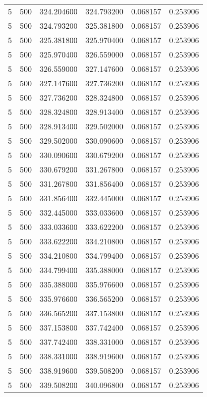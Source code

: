\begin{longtable}{rrrrrr}
5 & 500 & 324.204600 & 324.793200 & 0.068157 & 0.253906 \\
5 & 500 & 324.793200 & 325.381800 & 0.068157 & 0.253906 \\
5 & 500 & 325.381800 & 325.970400 & 0.068157 & 0.253906 \\
5 & 500 & 325.970400 & 326.559000 & 0.068157 & 0.253906 \\
5 & 500 & 326.559000 & 327.147600 & 0.068157 & 0.253906 \\
5 & 500 & 327.147600 & 327.736200 & 0.068157 & 0.253906 \\
5 & 500 & 327.736200 & 328.324800 & 0.068157 & 0.253906 \\
5 & 500 & 328.324800 & 328.913400 & 0.068157 & 0.253906 \\
5 & 500 & 328.913400 & 329.502000 & 0.068157 & 0.253906 \\
5 & 500 & 329.502000 & 330.090600 & 0.068157 & 0.253906 \\
5 & 500 & 330.090600 & 330.679200 & 0.068157 & 0.253906 \\
5 & 500 & 330.679200 & 331.267800 & 0.068157 & 0.253906 \\
5 & 500 & 331.267800 & 331.856400 & 0.068157 & 0.253906 \\
5 & 500 & 331.856400 & 332.445000 & 0.068157 & 0.253906 \\
5 & 500 & 332.445000 & 333.033600 & 0.068157 & 0.253906 \\
5 & 500 & 333.033600 & 333.622200 & 0.068157 & 0.253906 \\
5 & 500 & 333.622200 & 334.210800 & 0.068157 & 0.253906 \\
5 & 500 & 334.210800 & 334.799400 & 0.068157 & 0.253906 \\
5 & 500 & 334.799400 & 335.388000 & 0.068157 & 0.253906 \\
5 & 500 & 335.388000 & 335.976600 & 0.068157 & 0.253906 \\
5 & 500 & 335.976600 & 336.565200 & 0.068157 & 0.253906 \\
5 & 500 & 336.565200 & 337.153800 & 0.068157 & 0.253906 \\
5 & 500 & 337.153800 & 337.742400 & 0.068157 & 0.253906 \\
5 & 500 & 337.742400 & 338.331000 & 0.068157 & 0.253906 \\
5 & 500 & 338.331000 & 338.919600 & 0.068157 & 0.253906 \\
5 & 500 & 338.919600 & 339.508200 & 0.068157 & 0.253906 \\
5 & 500 & 339.508200 & 340.096800 & 0.068157 & 0.253906 \\

\end{longtable}
